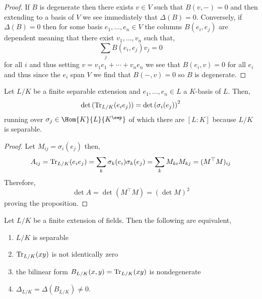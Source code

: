 \documentclass[12pt]{article}
\begin{document}
\begin{proof}
If $B$ is degenerate then there exists $v \in V$ such that $B(v, -) = 0$ and then extending to a basis of $V$ we see immediately that $\Delta(B) = 0$. Conversely, if $\Delta(B) = 0$ then for some basis $e_1, \dots, e_n \in V$ the columns $B(e_i, e_j)$ are dependent meaning that there exist $v_1, \dots, v_n$ such that,
\[ \sum_{j} B(e_i, e_j) v_j = 0 \]
for all $i$ and thus setting $v = v_1 e_1 + \cdots + v_n e_n$ we see that $B(e_i, v) = 0$ for all $e_i$ and thus since the $e_i$ span $V$ we find that $B(-, v) = 0$ so $B$ is degenerate.
\end{proof}

\begin{lemma}
Let $L/K$ be a finite separable extension and $e_1, \dots, e_n \in L$ a $K$-basis of $L$. Then,
\[ \det{(\mathrm{Tr}_{L/K}(e_i e_j))} = \det{(\sigma_i(e_j))}^2 \]
running over $\sigma_j \in \Hom{K}{L}{K^\sep}$ of which there are $[L : K]$ because $L/K$ is separable.
\end{lemma}

\begin{proof}
Let $M_{ij} = \sigma_i(e_j)$ then,
\[ A_{ij} = \mathrm{Tr}_{L/K}(e_i e_j) = \sum_{k} \sigma_k(e_i) \sigma_k(e_j) = \sum_k M_{ki} M_{kj} = (M^\top M)_{ij} \]
Therefore,
\[ \det{A} = \det{(M^\top M)} = (\det{M})^2 \]
proving the proposition.
\end{proof}

\begin{lemma}
Let $L/K$ be a finite extension of fields. Then the following are equivalent,
\begin{enumerate}
\item $L/K$ is separable
\item $\mathrm{Tr}_{L/K}(xy)$ is not identically zero
\item the bilinear form $B_{L/K}(x,y) = \mathrm{Tr}_{L/K}{(xy)}$ is nondegenerate
\item $\Delta_{L/K} = \Delta(B_{L/K}) \neq 0$.
\end{enumerate}
\end{lemma}
\end{document}
